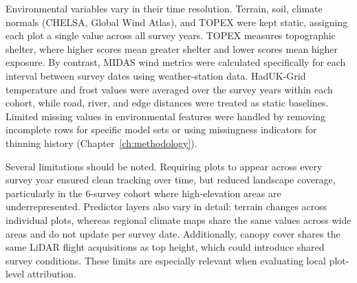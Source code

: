 Environmental variables vary in their time resolution. Terrain, soil, climate normals (CHELSA, Global Wind Atlas), and TOPEX were kept static, assigning each plot a single value across all survey years. TOPEX measures topographic shelter, where higher scores mean greater shelter and lower scores mean higher exposure. By contrast, MIDAS wind metrics were calculated specifically for each interval between survey dates using weather-station data. HadUK-Grid temperature and frost values were averaged over the survey years within each cohort, while road, river, and edge distances were treated as static baselines. Limited missing values in environmental features were handled by removing incomplete rows for specific model sets or using missingness indicators for thinning history (Chapter~\ref{ch:methodology}).

Several limitations should be noted. Requiring plots to appear across every survey year ensured clean tracking over time, but reduced landscape coverage, particularly in the 6-survey cohort where high-elevation areas are underrepresented. Predictor layers also vary in detail: terrain changes across individual plots, whereas regional climate maps share the same values across wide areas and do not update per survey date. Additionally, canopy cover shares the same LiDAR flight acquisitions as top height, which could introduce shared survey conditions. These limits are especially relevant when evaluating local plot-level attribution.

